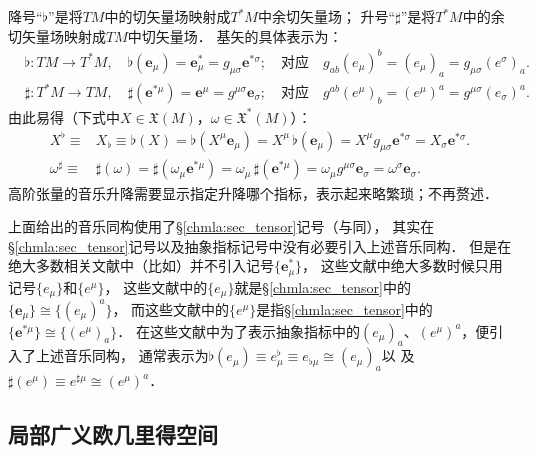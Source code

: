 降号“$\flat$”是将$TM$中的切矢量场映射成$T^*M$中余切矢量场；
升号“$\sharp$”是将$T^*M$中的余切矢量场映射成$TM$中切矢量场．
基矢的具体表示为：
\begin{align*}
	&\flat: TM \to T^*M, \quad \flat(\boldsymbol{e}_\mu) 
	= \boldsymbol{e}_\mu^{*}=g_{\mu \sigma}\boldsymbol{e}^{*\sigma} ;
	\quad \text{对应}\quad
	g_{ab} (e_\mu)^b = (e_\mu)_a =  g_{\mu \sigma} (e^\sigma)_a . \\
	&\sharp: T^*M \to TM, \quad \sharp(\boldsymbol{e}^{*\mu})  
	= \boldsymbol{e}^\mu=g^{\mu \sigma}\boldsymbol{e}_{\sigma} ;
	\quad \text{对应}\quad
	g^{ab} (e^\mu)_b  = (e^\mu)^a=  g^{\mu \sigma} (e_\sigma)^a .
\end{align*}
由此易得（下式中$X\in \mathfrak{X}(M)$，$\omega \in \mathfrak{X}^*(M)$）：
\begin{align*}
	X^{\flat} \equiv& X_{\flat} \equiv \flat(X) = \flat (X^\mu \boldsymbol{e}_\mu) = X^\mu \,  \flat ( \boldsymbol{e}_\mu)
	=X^\mu g_{\mu \sigma}\boldsymbol{e}^{*\sigma} = X_\sigma \boldsymbol{e}^{*\sigma}. \\
	\omega^{\sharp} \equiv& \sharp(\omega) = \sharp(\omega_\mu \boldsymbol{e}^{*\mu})
	= \omega_\mu \,  \sharp( \boldsymbol{e}^{*\mu}) = \omega_\mu g^{\mu \sigma}\boldsymbol{e}_{\sigma}
	=\omega^\sigma \boldsymbol{e}_{\sigma}.
\end{align*}
高阶张量的音乐升降需要显示指定升降哪个指标，表示起来略繁琐；不再赘述．

上面给出的音乐同构使用了\S\ref{chmla:sec_tensor}记号（与\parencite{cc2001-zh}同），
其实在\S\ref{chmla:sec_tensor}记号以及抽象指标记号中没有必要引入上述音乐同构．
但是在{\kaishu 绝大多数}相关文献中（比如\parencite{chen-li-2023-2ed-v1}）并不引入记号$\{\boldsymbol{e}_\mu^{*}\}$，
这些文献中绝大多数时候只用记号$\{{e}_\mu\}$和$\{{e}^{\mu}\}$，
这些文献中的$\{{e}_\mu\}$就是\S\ref{chmla:sec_tensor}中的$\{\boldsymbol{e}_\mu\}\cong \{(e_\mu)^a\}$，
而这些文献中的$\{{e}^{\mu}\}$是指\S\ref{chmla:sec_tensor}中的$\{\boldsymbol{e}^{*\mu}\}\cong \{(e^\mu)_a\}$．
在这些文献中为了表示抽象指标中的$(e_\mu)_a$、$(e^\mu)^a$，便引入了上述音乐同构，
通常表示为$\flat(e_\mu) \equiv {e}_\mu^\flat \equiv {e}_{\flat \mu} \cong (e_\mu)_a$以
及$\sharp(e^\mu)\equiv {e}^{\sharp \mu} \cong (e^\mu)^a$．




\subsection{局部广义欧几里得空间}\label{chrg:sec_local-EuclideanSpace}

